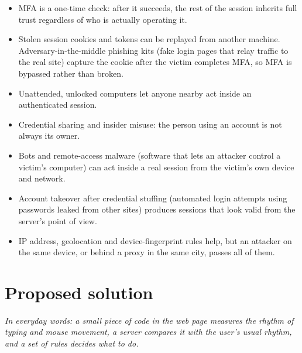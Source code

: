 \documentclass[10pt,letterpaper]{article}
\begin{document}
\begin{itemize}
  \item MFA is a one-time check: after it succeeds, the rest of the session inherits full trust regardless of who is actually operating it.
  \item Stolen session cookies and tokens can be replayed from another machine. Adversary-in-the-middle phishing kits (fake login pages that relay traffic to the real site) capture the cookie after the victim completes MFA, so MFA is bypassed rather than broken.
  \item Unattended, unlocked computers let anyone nearby act inside an authenticated session.
  \item Credential sharing and insider misuse: the person using an account is not always its owner.
  \item Bots and remote-access malware (software that lets an attacker control a victim's computer) can act inside a real session from the victim's own device and network.
  \item Account takeover after credential stuffing (automated login attempts using passwords leaked from other sites) produces sessions that look valid from the server's point of view.
  \item IP address, geolocation and device-fingerprint rules help, but an attacker on the same device, or behind a proxy in the same city, passes all of them.
\end{itemize}

\section{Proposed solution}

\emph{In everyday words: a small piece of code in the web page measures the rhythm of typing and mouse movement, a server compares it with the user's usual rhythm, and a set of rules decides what to do.}
\end{document}
